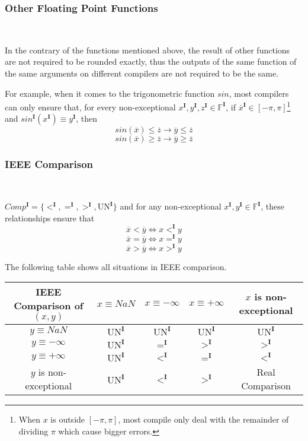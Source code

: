 \documentclass[12pt]{article}
\newcommand{\F}{\mathbb{F}}
\newcommand{\IEEE}{\mathbf{I}}
\newcommand{\OL}{\overline}
\begin{document}
\subsubsection{Other Floating Point Functions} \

In the contrary of the functions mentioned above, the result of other functions are not required to be rounded exactly, thus the outputs of the same function of the same arguments on different compilers are not required to be the same.

For example, when it comes to the trigonometric function $sin$, most compilers can only ensure that, for every non-exceptional $x^\IEEE, y^\IEEE, z^\IEEE \in \F ^ \IEEE$, if $\OL x^\IEEE \in [-\pi, \pi]$\footnote{When $x$ is outside $[-\pi, \pi]$, most compile only deal with the remainder of dividing $\pi$ which cause bigger errors.} and $sin^\IEEE(x^\IEEE)\equiv y^\IEEE$, then
$$sin(\OL x) \leq \OL z \to \OL y \leq \OL z$$
$$sin(\OL x) \geq \OL z \to \OL y \geq \OL z$$

\subsubsection{IEEE Comparison} \

$Comp^\IEEE = \{<^\IEEE, =^\IEEE, >^\IEEE, \text{UN}^\IEEE\}$ and for any non-exceptional $x^\IEEE, y^\IEEE \in \F ^\IEEE$, these relationships ensure that
$$\OL x < \OL y \iff x <^\IEEE y$$
$$\OL x = \OL y \iff x =^\IEEE y$$
$$\OL x > \OL y \iff x >^\IEEE y$$

The following table shows all situations in IEEE comparison.

\begin{tabular}{|c|c|c|c|c|}
 \hline IEEE Comparison of $(x,y)$ & $x \equiv NaN$ & $x \equiv -\infty$ & $x \equiv +\infty$ & $x$ is non-exceptional  \\
 \hline $y \equiv NaN$             & $\text{UN}^\IEEE$ &  $\text{UN}^\IEEE$ & $\text{UN}^\IEEE$&   $\text{UN}^\IEEE$    \\
 \hline $y \equiv -\infty$         & $\text{UN}^\IEEE$ &      $=^\IEEE$     &     $>^\IEEE$    &       $>^\IEEE$        \\
 \hline $y \equiv +\infty$         & $\text{UN}^\IEEE$ &      $<^\IEEE$     &     $=^\IEEE$    &       $<^\IEEE$        \\
 \hline $y$ is non-exceptional     & $\text{UN}^\IEEE$ &      $<^\IEEE$     &     $>^\IEEE$    &  Real Comparison\\
 \hline
\end{tabular}
\end{document}

